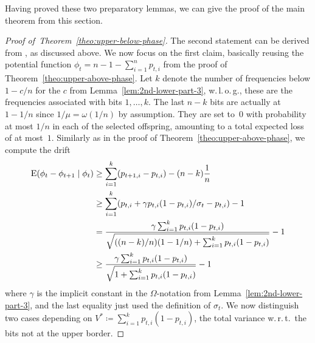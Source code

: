 \documentclass[11pt, a4paper]{article}
\newcommand*{\E}{\mathrm{E}}
\newcommand{\wrt}{w.\,r.\,t.\xspace}
\newenvironment{proofof}[1]{\begin{proof}[Proof of~#1]}{\end{proof}}
\begin{document}
Having proved these two preparatory lemmas, we can give the proof of the main theorem from this section.

\begin{proofof}{Theorem~\ref{theo:upper-below-phase}}
The second statement can be derived from \cite{KrejcaWittFOGA2017}, as  discussed above. We now focus 
on the first claim, basically reusing  the potential function $\phi_t =n-1-\sum_{i=1}^n p_{t,i}$ from the proof 
of Theorem~\ref{theo:upper-above-phase}. Let $k$ denote the 
number of frequencies below $1-c/n$ for the $c$ from Lemma~\ref{lem:2nd-lower-part-3}, w.\,l.\,o.\,g., these are the 
frequencies associated with bits $1,\dots,k$. 
The last $n-k$ bits are actually at $1-1/n$ since $1/\mu=\omega(1/n)$ by assumption. They are 
set to~$0$ with probability at most $1/n$ in each of the selected offspring, amounting 
to a total expected loss of at most~$1$. Similarly as in the proof of Theorem~\ref{theo:upper-above-phase}, we 
compute the drift
\begin{align}
\notag
\E(\phi_t-  \phi_{t+1}\mid \phi_t)  & \ge \sum_{i=1}^k (p_{t+1,i}-p_{t,i}) - (n-k)\frac{1}{n}\\\notag
& \ge \sum_{i=1}^k (p_{t,i}+\gamma 
p_{t,i}(1-p_{t,i})/\sigma_t - p_{t,i}) - 1 \\\notag
& =  \frac{\gamma\sum_{i=1}^k p_{t,i}(1-p_{t,i})}{\sqrt{((n-k)/n)(1-1/n)+\sum_{i=1}^k p_{t,i}(1-p_{t,i})}} -1 \\
&  \ge \frac{\gamma\sum_{i=1}^k p_{t,i}(1-p_{t,i})}{\sqrt{1+\sum_{i=1}^k p_{t,i}(1-p_{t,i})}}    - 1
\label{eq:drift-below-phase}
\end{align}
where $\gamma$ is the implicit constant in the 
$\Omega$-notation from Lemma~\ref{lem:2nd-lower-part-3}, and  
the last equality just used the definition of $\sigma_t$. We now distinguish two cases 
depending on $V^*\coloneqq  \sum_{i=1}^k p_{t,i}(1-p_{t,i})$, the total variance \wrt\ the bits not at the upper border. 


\end{proofof}
\end{document}
